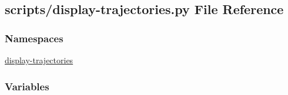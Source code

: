 \hypertarget{display-trajectories_8py}{\subsection{scripts/display-\/trajectories.py File Reference}
\label{display-trajectories_8py}
}
\subsubsection*{Namespaces}
\begin{DoxyCompactItemize}
\item 
\hyperlink{namespacedisplay-trajectories}{display-\/trajectories}
\end{DoxyCompactItemize}
\subsubsection*{Variables}
